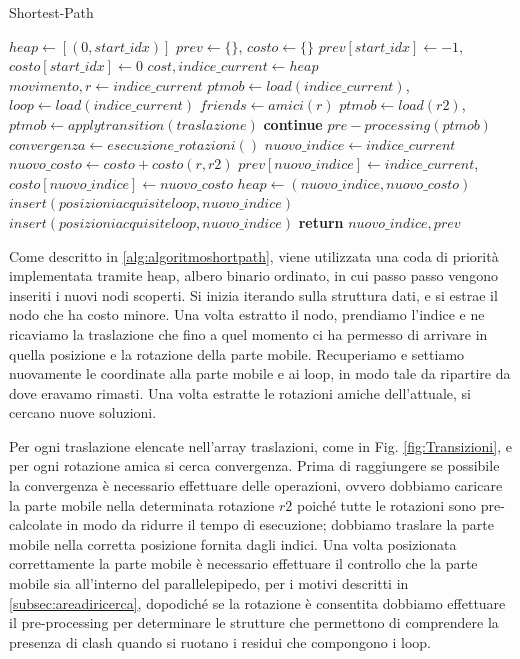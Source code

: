 \begin{algorithm}
	\caption{Shortest-Path}
	\label{alg:algoritmoshortpath}
	\begin{algorithmic}
		\State $heap \gets [(0, start\_idx)]$
		\State $prev \gets \{\}$, $costo \gets \{\}$
		\State $prev[start\_idx] \gets -1$, $costo[start\_idx] \gets 0$
		\State $cost, indice\_current \gets heap$
		\State $movimento, r \gets indice\_current$
		\State $ptmob \gets load(indice\_current)$, $loop \gets load(indice\_current)$
		\State $friends \gets amici(r)$
		\State $ptmob \gets load(r2)$, $ptmob \gets applytransition(traslazione)$
		\State \textbf{continue}
		\EndIf
		\State $pre-processing(ptmob)$
		\State $convergenza \gets esecuzione\_rotazioni()$
		\State $nuovo\_indice \gets indice\_current$
		\State $nuovo\_costo \gets costo + costo(r, r2)$
		\State $prev[nuovo\_indice] \gets indice\_current$, 
		\State $costo[nuovo\_indice] \gets nuovo\_costo$
		\State $heap \gets (nuovo\_indice, nuovo\_costo)$
		\State $insert(posizioniacquisiteloop, nuovo\_indice)$
		\State $insert(posizioniacquisiteloop, nuovo\_indice)$
		\State \textbf{return} $nuovo\_indice, prev$
		\EndIf
		\EndIf
		\EndIf 
		\EndFor
		\EndFor
		\EndWhile 
		\EndProcedure
	\end{algorithmic}
\end{algorithm}
Come descritto in \ref{alg:algoritmoshortpath}, viene utilizzata una coda di priorità implementata tramite heap, albero binario ordinato, in cui passo passo vengono inseriti i nuovi nodi scoperti. Si inizia iterando sulla struttura dati, e si estrae il nodo che ha costo minore. Una volta estratto il nodo, prendiamo l'indice e ne ricaviamo la traslazione che fino a quel momento ci ha permesso di arrivare in quella posizione e la rotazione della parte mobile. Recuperiamo e settiamo nuovamente le coordinate alla parte mobile e ai loop, in modo tale da ripartire da dove eravamo rimasti. Una volta estratte le rotazioni amiche dell'attuale, si cercano nuove soluzioni. 

Per ogni traslazione elencate nell'array traslazioni, come in Fig. \ref{fig:Transizioni}, e per ogni rotazione amica si cerca convergenza. Prima di raggiungere se possibile la convergenza è necessario effettuare delle operazioni, ovvero dobbiamo caricare la parte mobile nella determinata rotazione $r2$ poiché tutte le rotazioni sono pre-calcolate in modo da ridurre il tempo di esecuzione; dobbiamo traslare la parte mobile nella corretta posizione fornita dagli indici. Una volta posizionata correttamente la parte mobile è necessario effettuare il controllo che la parte mobile sia all'interno del parallelepipedo, per i motivi descritti in \ref{subsec:areadiricerca}, dopodiché se la rotazione è consentita dobbiamo effettuare il pre-processing per determinare le strutture che permettono di comprendere la presenza di clash quando si ruotano i residui che compongono i loop. 

